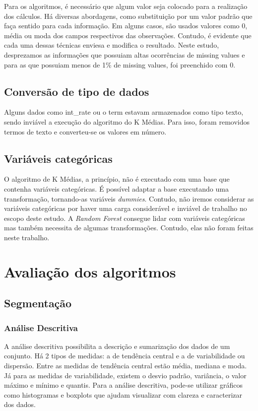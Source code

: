 Para os algoritmos, é necessário que algum valor seja colocado para a realização dos cálculos. Há diversas abordagens, como substituição por um valor padrão que faça sentido para cada informação. Em alguns casos, são usados valores como 0, média ou moda dos campos respectivos das observações. Contudo, é evidente que cada uma dessas técnicas enviesa e modifica o resultado. Neste estudo, desprezamos as informações que possuiam altas ocorrências de missing values e para as que possuiam menos de 1\% de missing values, foi preenchido com 0. 

\subsection{Conversão de tipo de dados}
Alguns dados como int\_rate ou o term estavam armazenados como tipo texto, sendo inviável a execução do algoritmo do K Médias. Para isso, foram removidos termos de texto e converteu-se os valores em número.


\subsection{Variáveis categóricas}
O algoritmo de K Médias, a princípio, não é executado com uma base que contenha variáveis categóricas. É possível adaptar a base executando uma transformação, tornando-as variáveis \emph{dummies}. Contudo, não iremos considerar as variáveis categóricas por haver uma carga considerável e inviável de trabalho no escopo deste estudo. A \emph{Random Forest} consegue lidar com variáveis categóricas mas também necessita de algumas transformações. Contudo, elas não foram feitas neste trabalho.


\section{Avaliação dos algoritmos}

\subsection{Segmentação}

\subsubsection{Análise Descritiva}
A análise descritiva possibilita a descrição e sumarização dos dados de um conjunto. Há 2 tipos de medidas: a de tendência central e a de variabilidade ou dispersão. Entre as medidas de tendência central estão média, mediana e moda. Já para as medidas de variabilidade, existem o desvio padrão, variância, o valor máximo e mínimo e quantis.
Para a análise descritiva, pode-se utilizar gráficos como histogramas e boxplots que ajudam visualizar com clareza e caracterizar dos dados.


